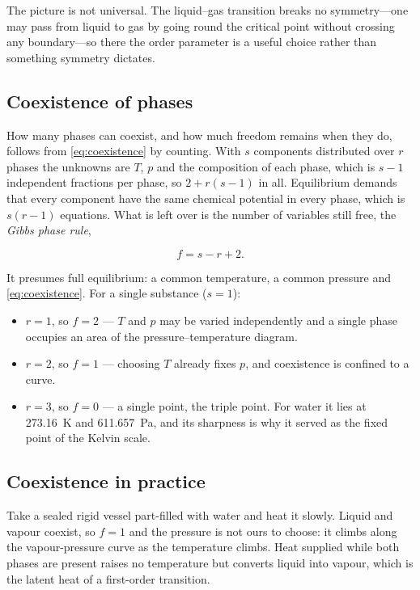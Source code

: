         The picture is not universal. The liquid--gas transition breaks no symmetry---one may pass from liquid to gas by going round the critical point without crossing any boundary---so there the order parameter is a useful choice rather than something symmetry dictates.

    \subsection{Coexistence of phases}

        How many phases can coexist, and how much freedom remains when they do, follows from \cref{eq:coexistence} by counting. With $s$ components distributed over $r$ phases the unknowns are $T$, $p$ and the composition of each phase, which is $s-1$ independent fractions per phase, so $2 + r(s-1)$ in all. Equilibrium demands that every component have the same chemical potential in every phase, which is $s(r-1)$ equations. What is left over is the number of variables still free, the \emph{Gibbs phase rule},

        \begin{equation}\label{eq:gibbs-phase}
            f = s - r + 2 .
        \end{equation}

        It presumes full equilibrium: a common temperature, a common pressure and \cref{eq:coexistence}. For a single substance ($s = 1$):

        \begin{itemize}
            \item $r = 1$, so $f = 2$ --- $T$ and $p$ may be varied independently and a single phase occupies an area of the pressure--temperature diagram.
            \item $r = 2$, so $f = 1$ --- choosing $T$ already fixes $p$, and coexistence is confined to a curve.
            \item $r = 3$, so $f = 0$ --- a single point, the triple point. For water it lies at \qty{273.16}{\kelvin} and \qty{611.657}{\pascal}, and its sharpness is why it served as the fixed point of the Kelvin scale.
        \end{itemize}

    \subsection{Coexistence in practice}

        Take a sealed rigid vessel part-filled with water and heat it slowly. Liquid and vapour coexist, so $f = 1$ and the pressure is not ours to choose: it climbs along the vapour-pressure curve as the temperature climbs. Heat supplied while both phases are present raises no temperature but converts liquid into vapour, which is the latent heat of a first-order transition. 

